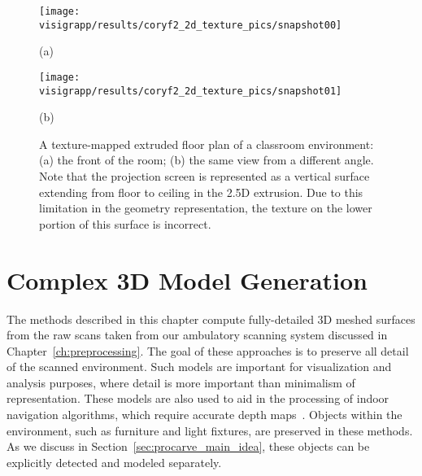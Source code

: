\documentclass[12pt,onecolumn,oneside]{book}
\begin{document}
\begin{figure}[p]
   \centering
   \begin{minipage}[b]{0.99\linewidth}
   \texttt{[image: visigrapp/results/coryf2\_2d\_texture\_pics/snapshot00]}
   \centerline{(a)}
   \end{minipage}
   \hfill
   \begin{minipage}[b]{0.99\linewidth}
   \texttt{[image: visigrapp/results/coryf2\_2d\_texture\_pics/snapshot01]}
   \centerline{(b)}
   \end{minipage}

   \caption[Limitations of 2.5D models.]{A texture-mapped extruded floor plan of a classroom environment: (a) the front of the room; (b) the same view from a different angle.  Note that the projection screen is represented as a vertical surface extending from floor to ceiling in the 2.5D extrusion.  Due to this limitation in the geometry representation, the texture on the lower portion of this surface is incorrect.
   \protect
   \label{fig:cory299_texture}}
\end{figure}


\chapter{Complex 3D Model Generation}
\label{ch:carving}

The methods described in this chapter compute fully-detailed 3D meshed surfaces from the raw scans taken from our ambulatory scanning system discussed in Chapter~\ref{ch:preprocessing}.  The goal of these approaches is to preserve all detail of the scanned environment.  Such models are important for visualization and analysis purposes, where detail is more important than minimalism of representation.  These models are also used to aid in the processing of indoor navigation algorithms, which require accurate depth maps~\cite{Liang13}.  Objects within the environment, such as furniture and light fixtures, are preserved in these methods.  As we discuss in Section~\ref{sec:procarve_main_idea}, these objects can be explicitly detected and modeled separately.
\end{document}
